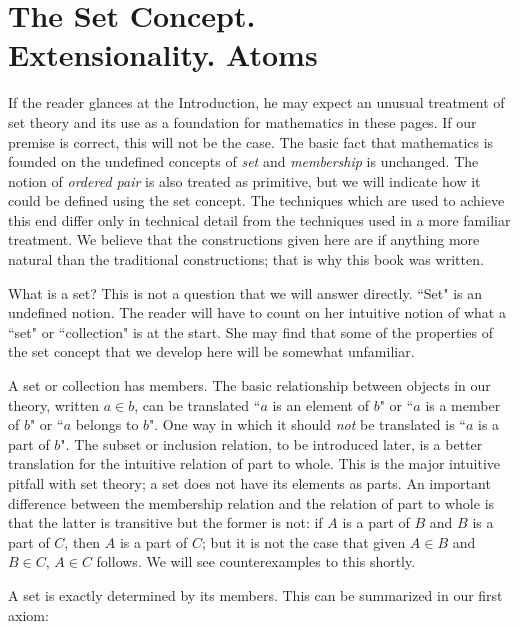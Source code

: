 \chapter[The Set Concept]{The Set Concept.\\
Extensionality. Atoms}


If the reader glances at the Introduction, he may
expect an unusual treatment of set theory and its use as a foundation
for mathematics in these pages.  If our premise is correct, this will
not be the case.  The basic fact that mathematics is founded on
the undefined concepts of {\itshape set\/} and {\itshape
membership\/} is unchanged.  The notion of {\itshape
ordered pair\/} is also treated as primitive, but
we will indicate how it could be defined using the set concept. The
techniques which are used to achieve this end differ only in technical
detail from the techniques used in a more familiar treatment.  We
believe that the constructions given here are if anything more natural
than the traditional constructions; that is why this book was written.

What is a set?  This is not a question that we will answer
directly.  ``Set" is an undefined notion.  The reader will have to
count on her intuitive notion of what a ``set" or ``collection" is at
the start.  She may find that some of the properties of the set concept
that we develop here will be somewhat unfamiliar.

A set or collection has members.  The basic relationship between
objects in our theory, written $a \in b$, can be translated ``$a$ is
an element of $b$" or ``$a$ is a member of $b$" or ``$a$
belongs to $b$".  One way in which it should {\itshape not\/} be translated is
``$a$ is a part of $b$".  The subset or
inclusion relation, to be introduced
later, is a better translation for the intuitive relation of part to
whole.  This is the major intuitive pitfall
with set theory; a set does not have its elements as parts.  An important
difference between the membership relation and the relation of part to whole is
that the latter is transitive but the former is not: if $A$ is a part of $B$
and $B$ is a part of $C$, then $A$ is a part of $C$; but it is not the
case that given $A \in B$ and $B \in C$, $A \in C$ follows.  We will
see counterexamples to this shortly.

A set is exactly determined by its members.  This can be
summarized in our first axiom:


